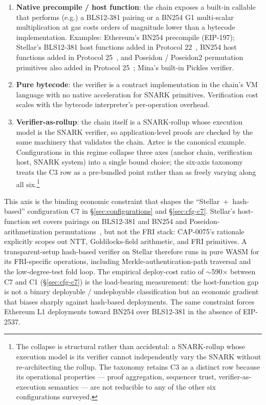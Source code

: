 \begin{enumerate}
  \item \textbf{Native precompile / host function}: the chain exposes
    a built-in callable that performs (e.g.) a BLS12-381 pairing or
    a BN254 G1 multi-scalar multiplication at gas costs orders of
    magnitude lower than a bytecode implementation. Examples:
    Ethereum's BN254 precompile (EIP-197); Stellar's BLS12-381 host
    functions added in Protocol 22~\cite{stellar-cap-0059}, BN254
    host functions added in Protocol 25~\cite{stellar-cap-0074},
    and Poseidon / Poseidon2 permutation primitives also added in
    Protocol 25~\cite{stellar-cap-0075}; Mina's built-in Pickles
    verifier.
  \item \textbf{Pure bytecode}: the verifier is a contract
    implementation in the chain's VM language with no native
    acceleration for SNARK primitives. Verification cost scales with
    the bytecode interpreter's per-operation overhead.
  \item \textbf{Verifier-as-rollup}: the chain itself is a SNARK-rollup
    whose execution model is the SNARK verifier, so application-level
    proofs are checked by the same machinery that validates the
    chain. Aztec is the canonical example. Configurations in this
    regime collapse three axes (anchor chain, verification host,
    SNARK system) into a single bound choice; the six-axis taxonomy
    treats the C3 row as a pre-bundled point rather than as freely
    varying along all six.\footnote{The collapse is structural rather
    than accidental: a SNARK-rollup whose execution model is its
    verifier cannot independently vary the SNARK without
    re-architecting the rollup. The taxonomy retains C3 as a
    distinct row because its operational properties --- proof
    aggregation, sequencer trust, verifier-as-execution semantics
    --- are not reducible to any of the other six configurations
    surveyed.}
\end{enumerate}

This axis is the binding economic constraint that
shapes the ``Stellar~+~hash-based'' configuration C7 in
\S\ref{sec:configurations} and \S\ref{sec:cfg-c7}. Stellar's
host-function set covers pairings on BLS12-381 and BN254 and
Poseidon-arithmetization permutations~\cite{stellar-cap-0075}, but
not the FRI stack: CAP-0075's rationale explicitly scopes out NTT,
Goldilocks-field arithmetic, and FRI primitives. A transparent-setup
hash-based verifier on Stellar therefore runs in pure WASM for its
FRI-specific operations, including Merkle-authentication-path
traversal and the low-degree-test fold loop. The empirical
deploy-cost ratio of $\sim$590$\times$ between C7 and C1
(\S\ref{sec:cfg-c7}) is the load-bearing measurement: the
host-function gap is not a binary deployable / undeployable
classification but an economic gradient that biases sharply against
hash-based deployments. The same constraint forces Ethereum L1
deployments toward BN254 over BLS12-381 in the absence of EIP-2537.

